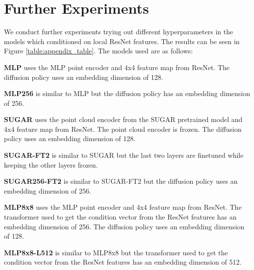 \section{Further Experiments}

We conduct further experiments trying out different hyperparameters in the models which conditioned on local ResNet features. The results can be seen in Figure \ref{table:appendix_table}. The models used are as follows:

\textbf{MLP}
uses the MLP point encoder and 4x4 feature map from ResNet. The diffusion policy uses an embedding dimension of 128. 

\textbf{MLP256}
is similar to MLP but the diffusion policy has an embedding dimension of 256. 

\textbf{SUGAR}
uses the point cloud encoder from the SUGAR pretrained model and 4x4 feature map from ResNet. The point cloud encoder is frozen. The diffusion policy uses an embedding dimension of 128.

\textbf{SUGAR-FT2}
is similar to SUGAR but the last two layers are finetuned while keeping the other layers frozen.

\textbf{SUGAR256-FT2}
is similar to SUGAR-FT2 but the diffusion policy uses an embedding dimension of 256.

\textbf{MLP8x8}
uses the MLP point encoder and 4x4 feature map from ResNet. The transformer used to get the condition vector from the ResNet features has an embedding dimension of 256. The diffusion policy uses an embedding dimension of 128. 

\textbf{MLP8x8-L512}
is similar to MLP8x8 but the transformer used to get the condition vector from the ResNet features has an embedding dimension of 512.

